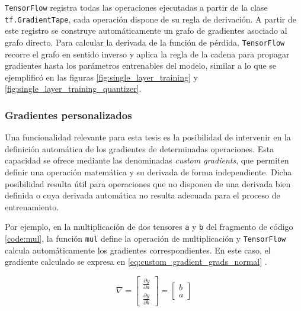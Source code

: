 \texttt{TensorFlow} registra todas las operaciones ejecutadas a partir de la clase \texttt{tf.\allowbreak{}GradientTape}, cada operación dispone de su regla de derivación. A partir de este registro se construye automáticamente un grafo de gradientes asociado al grafo directo. Para calcular la derivada de la función de pérdida, \texttt{TensorFlow} recorre el grafo en sentido inverso y aplica la regla de la cadena para propagar gradientes hasta los parámetros entrenables del modelo, similar a lo que se ejemplific\'o en las figuras \ref{fig:single_layer_training} y \ref{fig:single_layer_training_quantizer}.

\subsubsection{Gradientes personalizados}
\label{sec:gradientes_personalizados}
Una funcionalidad relevante para esta tesis es la posibilidad de intervenir en la definición automática de los gradientes de determinadas operaciones. Esta capacidad se ofrece mediante las denominadas \textit{custom gradients}, que permiten definir una operación matemática y su derivada de forma independiente. Dicha posibilidad resulta útil para operaciones que no disponen de una derivada bien definida o cuya derivada automática no resulta adecuada para el proceso de entrenamiento.


Por ejemplo, en la multiplicación de dos tensores \texttt{a} y \texttt{b} del fragmento de código \ref{code:mul}, la función \texttt{mul} define la operación de multiplicación y \texttt{TensorFlow} calcula automáticamente los gradientes correspondientes. En este caso, el gradiente calculado se expresa en \eqref{eq:custom_gradient_grads_normal} .

\begin{equation}
\label{eq:custom_gradient_grads_normal}
\nabla=\begin{bmatrix}\frac{\partial y}{\partial a} \\ \frac{\partial y}{\partial b} \end{bmatrix} = \begin{bmatrix} b \\ a \end{bmatrix}
\end{equation}

